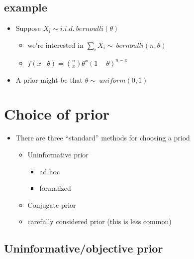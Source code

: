 \subsection{example}

\begin{itemize}[leftmargin=0pt]
\item Suppose $X_i \sim i.i.d.\ bernoulli(\theta)$
\begin{itemize}
\item we're interested in $\sum_i X_i \sim\ bernoulli(n, \theta)$
\item $f(x \mid \theta) = \binom{n}{x} \theta^x (1-\theta)^{n-x}$
\end{itemize}
\item A prior might be that $\theta \sim\ uniform(0,1)$
\end{itemize}

\section{Choice of prior}

\begin{itemize}[leftmargin=0pt]
\item There are three ``standard'' methods for choosing a priod
\begin{itemize}
\item Uninformative prior
\begin{itemize}
\item ad hoc
\item formalized
\end{itemize}
\item Conjugate prior
\item carefully considered prior (this is less common)
\end{itemize}
\end{itemize}

\subsection{Uninformative/objective prior}

